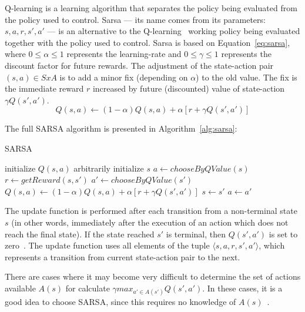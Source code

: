 Q-learning is a learning algorithm that separates the policy being evaluated from the policy used to control.
Sarsa --- its name comes from its parameters: $s,a,r,s',a'$ --- is an alternative to the Q-learning~\cite{graepel2004learningfight,stone2005reinforcement}
working policy being evaluated together with the policy used to control.
Sarsa is based on Equation~\ref{eq:sarsa}, where $0 \leq \alpha \leq 1$ represents the learning-rate and $0 \leq \gamma \leq 1$ represents the discount factor for future rewards.
The adjustment of the state-action pair $(s,a) \in SxA$ is to add a minor fix (depending on $\alpha$) to the old value.
The fix is the immediate reward $r$ increased by future (discounted) value of state-action $\gamma Q(s',a')$.
\begin{equation} \label{eq:sarsa}
	Q(s,a) \leftarrow (1 - \alpha) Q(s,a) + \alpha[r + \gamma Q(s',a')]
\end{equation}

The full SARSA algorithm is presented in Algorithm~\ref{alg:sarsa}:

\begin{algorithm}
	\caption{SARSA}
	\label{alg:sarsa}
	\begin{algorithmic}[1]
		\STATE initialize $Q(s,a)$ arbitrarily
			\STATE initialize $s$
			\STATE $a \gets chooseByQValue(s)$
				\STATE $r \gets getReward(s,s')$
				\STATE $a' \gets chooseByQValue(s')$
				\STATE $Q(s,a) \gets (1 - \alpha) Q(s,a) + \alpha[r + \gamma Q(s',a')]$
				\STATE $s \gets s'$
				\STATE $a \gets a'$
			\ENDFOR
		\ENDFOR
	\end{algorithmic}
\end{algorithm}

The update function is performed after each transition from a non-terminal state $s$ (in other words, immediately after the execution of an action which does not reach the final state).
If the state reached $s'$ is terminal, then $Q(s',a')$ is set to zero~\cite{sutton1998reinforcement}.
The update function uses all elements of the tuple $\langle s,a,r,s',a' \rangle$, which represents a transition from current state-action pair to the next.

There are cases where it may become very difficult to determine the set of actions available $A(s)$ for calculate $\gamma max_{a' \in A(s')}Q(s',a')$.
In these cases, it is a good idea to choose SARSA, since this requires no knowledge of $A(s)$~\cite{graepel2004learningfight}.



